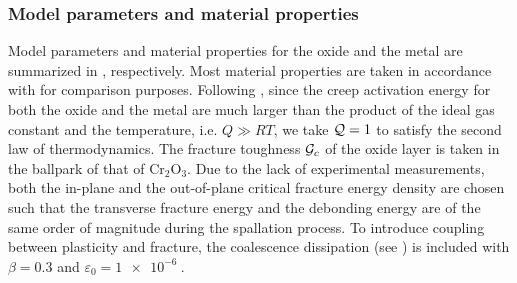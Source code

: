 \subsubsection{Model parameters and material properties}

Model parameters and material properties for the oxide and the metal are summarized in , respectively. Most material properties are taken in accordance with \cite{xue2020stress} for comparison purposes.
Following , since the creep activation energy for both the oxide and the metal are much larger than the product of the ideal gas constant and the temperature, i.e. $Q \gg RT$, we take $\mathcal{Q} = 1$ to satisfy the second law of thermodynamics. The fracture toughness ${\mathcal{G}_c}$ of the oxide layer is taken in the ballpark of that of Cr$_2$O$_3$. Due to the lack of experimental measurements, both the in-plane and the out-of-plane critical fracture energy density are chosen such that the transverse fracture energy and the debonding energy are of the same order of magnitude during the spallation process. To introduce coupling between plasticity and fracture, the coalescence dissipation (see ) is included with $\beta = 0.3$ and $\varepsilon_0 = \SI{1e-6}{}$.

